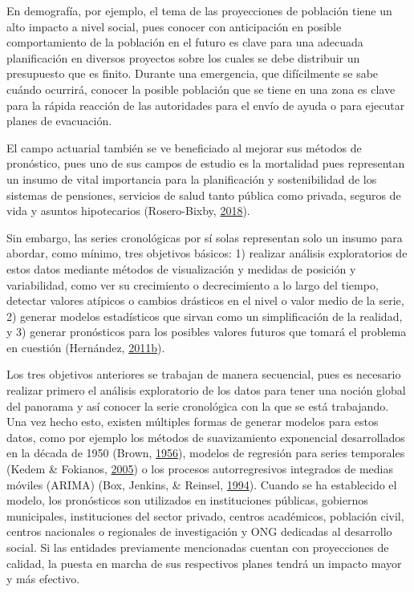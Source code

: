 \documentclass[]{article}
\begin{document}
En demografía, por ejemplo, el tema de las proyecciones de población
tiene un alto impacto a nivel social, pues conocer con anticipación en
posible comportamiento de la población en el futuro es clave para una
adecuada planificación en diversos proyectos sobre los cuales se debe
distribuir un presupuesto que es finito. Durante una emergencia, que
difícilmente se sabe cuándo ocurrirá, conocer la posible población que
se tiene en una zona es clave para la rápida reacción de las autoridades
para el envío de ayuda o para ejecutar planes de evacuación.

El campo actuarial también se ve beneficiado al mejorar sus métodos de
pronóstico, pues uno de sus campos de estudio es la mortalidad pues
representan un insumo de vital importancia para la planificación y
sostenibilidad de los sistemas de pensiones, servicios de salud tanto
pública como privada, seguros de vida y asuntos hipotecarios
(Rosero-Bixby, \protect\hyperlink{ref-supenprodc}{2018}).

Sin embargo, las series cronológicas por sí solas representan solo un
insumo para abordar, como mínimo, tres objetivos básicos: 1) realizar
análisis exploratorios de estos datos mediante métodos de visualización
y medidas de posición y variabilidad, como ver su crecimiento o
decrecimiento a lo largo del tiempo, detectar valores atípicos o cambios
drásticos en el nivel o valor medio de la serie, 2) generar modelos
estadísticos que sirvan como un simplificación de la realidad, y 3)
generar pronósticos para los posibles valores futuros que tomará el
problema en cuestión (Hernández,
\protect\hyperlink{ref-oscarh-2}{2011}\protect\hyperlink{ref-oscarh-2}{b}).

Los tres objetivos anteriores se trabajan de manera secuencial, pues es
necesario realizar primero el análisis exploratorio de los datos para
tener una noción global del panorama y así conocer la serie cronológica
con la que se está trabajando. Una vez hecho esto, existen múltiples
formas de generar modelos para estos datos, como por ejemplo los métodos
de suavizamiento exponencial desarrollados en la década de 1950 (Brown,
\protect\hyperlink{ref-brown}{1956}), modelos de regresión para series
temporales (Kedem \& Fokianos, \protect\hyperlink{ref-kedem}{2005}) o
los procesos autorregresivos integrados de medias móviles (ARIMA) (Box,
Jenkins, \& Reinsel, \protect\hyperlink{ref-box-jenkins}{1994}). Cuando
se ha establecido el modelo, los pronósticos son utilizados en
instituciones públicas, gobiernos municipales, instituciones del sector
privado, centros académicos, población civil, centros nacionales o
regionales de investigación y ONG dedicadas al desarrollo social. Si las
entidades previamente mencionadas cuentan con proyecciones de calidad,
la puesta en marcha de sus respectivos planes tendrá un impacto mayor y
más efectivo.
\end{document}
